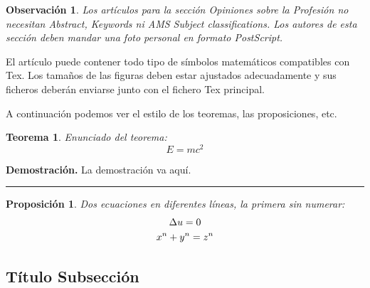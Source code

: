 \documentclass[10pt,twoside,spanish]{article}
\newtheorem{theorem}{Teorema}[section]
\newtheorem{proposition}{Proposición}[section]
\newtheorem{remark}{Observación}[section]
\renewenvironment*{proof}[1][Demostración]{\noindent \textbf{#1.} }{\ \rule{0.5em}{0.5em}}
\numberwithin{equation}{section}
\begin{document}
\begin{remark}
Los artículos para la sección \emph{Opiniones sobre la Profesión} no
necesitan Abstract, Keywords ni AMS Subject classifications. Los autores de
esta sección deben mandar una foto personal en formato PostScript.
\end{remark}

El artículo puede contener todo tipo de símbolos matemáticos compatibles con
Tex. Los tamaños de las figuras deben estar ajustados adecuadamente y sus
ficheros deberán enviarse junto con el fichero Tex principal.


A continuación podemos ver el estilo de los teoremas, las proposiciones, etc.

\begin{theorem}
Enunciado del teorema:%
\begin{equation}
E=mc^{2}  \label{Equation 1}
\end{equation}
\end{theorem}

\begin{proof}
La demostración va aquí.
\end{proof}

\begin{proposition}
Dos ecuaciones en diferentes líneas, la primera sin numerar:%
\begin{gather}
\Delta u=0  \notag \\
x^{n}+y^{n}=z^{n}  \label{Equation 2b}
\end{gather}
\end{proposition}

\subsection{Título Subsección}
\end{document}
